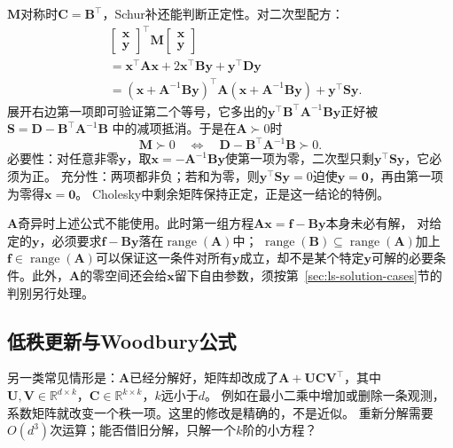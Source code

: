 $\bm M$对称时$\bm C=\bm B^\top$，Schur补还能判断正定性。对二次型配方：
\begin{equation}
 \begin{aligned}
 &\begin{bmatrix}\bm x\\\bm y\end{bmatrix}^{\top}
 \bm M\begin{bmatrix}\bm x\\\bm y\end{bmatrix}\\
 &=\bm x^\top\bm A\bm x+2\bm x^\top\bm B\bm y+\bm y^\top\bm D\bm y\\
 &=(\bm x+\bm A^{-1}\bm B\bm y)^\top
 \bm A(\bm x+\bm A^{-1}\bm B\bm y)+\bm y^\top\bm S\bm y.
 \end{aligned}
\end{equation}
展开右边第一项即可验证第二个等号，它多出的$\bm y^\top\bm B^\top\bm A^{-1}\bm B\bm y$正好被$\bm S=\bm D-\bm B^\top\bm A^{-1}\bm B$
中的减项抵消。于是在$\bm A\succ0$时
\begin{equation}
 \bm M\succ0\quad\Longleftrightarrow\quad
 \bm D-\bm B^\top\bm A^{-1}\bm B\succ0.
 \label{eq:matrix-analysis-schur-positive-definite}
\end{equation}
必要性：对任意非零$\bm y$，取$\bm x=-\bm A^{-1}\bm B\bm y$使第一项为零，二次型只剩$\bm y^\top\bm S\bm y$，它必须为正。
充分性：两项都非负；若和为零，则$\bm y^\top\bm S\bm y=0$迫使$\bm y=\bm0$，再由第一项为零得$\bm x=\bm0$。
Cholesky中剩余矩阵保持正定，正是这一结论的特例。

$\bm A$奇异时上述公式不能使用。此时第一组方程$\bm A\bm x=\bm f-\bm B\bm y$本身未必有解，
对给定的$\bm y$，必须要求$\bm f-\bm B\bm y$落在$\operatorname{range}(\bm A)$中；
$\operatorname{range}(\bm B)\subseteq\operatorname{range}(\bm A)$加上$\bm f\in\operatorname{range}(\bm A)$可以保证这一条件对所有$\bm y$成立，却不是某个特定$\bm y$可解的必要条件。此外，$\bm A$的零空间还会给$\bm x$留下自由参数，须按第~\ref{sec:ls-solution-cases}节的判别另行处理。

\subsection{低秩更新与Woodbury公式}

另一类常见情形是：$\bm A$已经分解好，矩阵却改成了$\bm A+\bm U\bm C\bm V^\top$，其中
$\bm U,\bm V\in\mathbb R^{d\times k}$，$\bm C\in\mathbb R^{k\times k}$，$k$远小于$d$。
例如在最小二乘中增加或删除一条观测，系数矩阵就改变一个秩一项。这里的修改是精确的，不是近似。
重新分解需要$O(d^3)$次运算；能否借旧分解，只解一个$k$阶的小方程？

